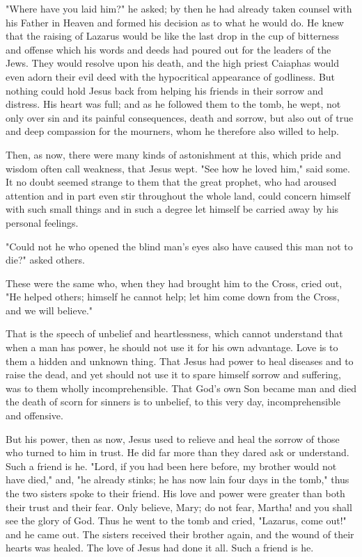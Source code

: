 "Where have you laid him?" he asked; by then he had already taken counsel with his Father in Heaven and formed his decision as to what he would do. He knew that the raising of Lazarus would be like the last drop in the cup of bitterness and offense which his words and deeds had poured out for the leaders of the Jews. They would resolve upon his death, and the high priest Caiaphas would even adorn their evil deed with the hypocritical appearance of godliness. But nothing could hold Jesus back from helping his friends in their sorrow and distress. His heart was full; and as he followed them to the tomb, he wept, not only over sin and its painful consequences, death and sorrow, but also out of true and deep compassion for the mourners, whom he therefore also willed to help.

Then, as now, there were many kinds of astonishment at this, which pride and wisdom often call weakness, that Jesus wept. "See how he loved him," said some. It no doubt seemed strange to them that the great prophet, who had aroused attention and in part even stir throughout the whole land, could concern himself with such small things and in such a degree let himself be carried away by his personal feelings.

"Could not he who opened the blind man’s eyes also have caused this man not to die?" asked others.

These were the same who, when they had brought him to the Cross, cried out, "He helped others; himself he cannot help; let him come down from the Cross, and we will believe."

That is the speech of unbelief and heartlessness, which cannot understand that when a man has power, he should not use it for his own advantage. Love is to them a hidden and unknown thing. That Jesus had power to heal diseases and to raise the dead, and yet should not use it to spare himself sorrow and suffering, was to them wholly incomprehensible. That God’s own Son became man and died the death of scorn for sinners is to unbelief, to this very day, incomprehensible and offensive.

But his power, then as now, Jesus used to relieve and heal the sorrow of those who turned to him in trust. He did far more than they dared ask or understand. Such a friend is he. "Lord, if you had been here before, my brother would not have died," and, "he already stinks; he has now lain four days in the tomb," thus the two sisters spoke to their friend. His love and power were greater than both their trust and their fear. Only believe, Mary; do not fear, Martha! and you shall see the glory of God. Thus he went to the tomb and cried, "Lazarus, come out!" and he came out. The sisters received their brother again, and the wound of their hearts was healed. The love of Jesus had done it all. Such a friend is he.

